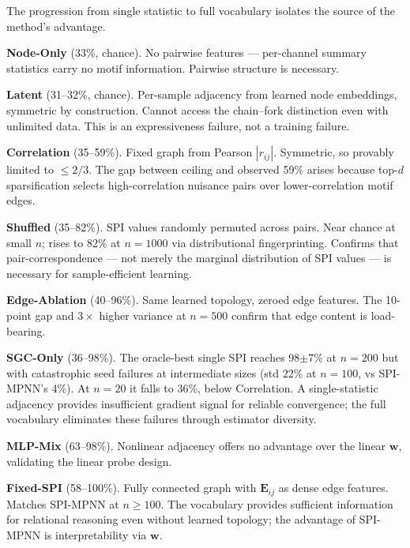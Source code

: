 \documentclass{article}
\begin{document}
\begin{small}
    
The progression from single statistic to full vocabulary isolates the source of the method's advantage.

\textbf{Node-Only} (33\%, chance). No pairwise features --- per-channel summary statistics carry no motif information. Pairwise structure is necessary.

\textbf{Latent} (31--32\%, chance). Per-sample adjacency from learned node embeddings, symmetric by construction. Cannot access the chain--fork distinction even with unlimited data. This is an expressiveness failure, not a training failure.

\textbf{Correlation} (35--59\%). Fixed graph from Pearson $|r_{ij}|$. Symmetric, so provably limited to $\leq 2/3$. The gap between ceiling and observed 59\% arises because top-$d$ sparsification selects high-correlation nuisance pairs over lower-correlation motif edges.

\textbf{Shuffled} (35--82\%). SPI values randomly permuted across pairs. Near chance at small $n$; rises to 82\% at $n{=}1000$ via distributional fingerprinting. Confirms that pair-correspondence --- not merely the marginal distribution of SPI values --- is necessary for sample-efficient learning.

\textbf{Edge-Ablation} (40--96\%). Same learned topology, zeroed edge features. The 10-point gap and $3{\times}$ higher variance at $n{=}500$ confirm that edge content is load-bearing.

\textbf{SGC-Only} (36--98\%). The oracle-best single SPI reaches 98$\pm$7\% at $n{=}200$ but with catastrophic seed failures at intermediate sizes (std 22\% at $n{=}100$, vs SPI-MPNN's 4\%). At $n{=}20$ it falls to 36\%, below Correlation. A single-statistic adjacency provides insufficient gradient signal for reliable convergence; the full vocabulary eliminates these failures through estimator diversity.

\textbf{MLP-Mix} (63--98\%). Nonlinear adjacency offers no advantage over the linear $\mathbf{w}$, validating the linear probe design.

\textbf{Fixed-SPI} (58--100\%). Fully connected graph with $\mathbf{E}_{ij}$ as dense edge features. Matches SPI-MPNN at $n \geq 100$. The vocabulary provides sufficient information for relational reasoning even without learned topology; the advantage of SPI-MPNN is interpretability via $\mathbf{w}$.
\end{small}
\end{document}
